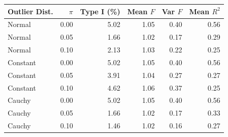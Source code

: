 
\begin{tabular}{lrrrrr}
\toprule
Outlier Dist. & $\pi$ & Type I (\%) & Mean $F$ & Var $F$ & Mean $R^2$\\
\midrule
Normal & 0.00 & 5.02 & 1.05 & 0.40 & 0.56\\
Normal & 0.05 & 1.66 & 1.02 & 0.17 & 0.29\\
Normal & 0.10 & 2.13 & 1.03 & 0.22 & 0.25\\
Constant & 0.00 & 5.02 & 1.05 & 0.40 & 0.56\\
Constant & 0.05 & 3.91 & 1.04 & 0.27 & 0.27\\
Constant & 0.10 & 4.62 & 1.06 & 0.37 & 0.25\\
Cauchy & 0.00 & 5.02 & 1.05 & 0.40 & 0.56\\
Cauchy & 0.05 & 1.66 & 1.02 & 0.17 & 0.33\\
Cauchy & 0.10 & 1.46 & 1.02 & 0.16 & 0.27\\
\bottomrule
\end{tabular}
